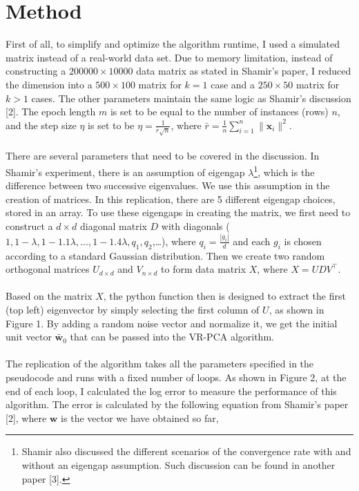 \documentclass{article}
\begin{document}
\section{Method}
First of all, to simplify and optimize the algorithm runtime, I used a simulated matrix instead of a real-world data set. Due to memory limitation, instead of constructing a $200000\times10000$ data matrix as stated in Shamir’s paper, I reduced the dimension into a $500\times100$ matrix for $k=1$ case and a $250\times50$ matrix for $k>1$ cases. The other parameters maintain the same logic as Shamir’s discussion [2]. The epoch length $m$ is set to be equal to the number of instances (rows) $n$, and the step size $\eta$ is set to be $\eta=\frac{1}{\bar{r}\sqrt{n}}$, where $\bar{r}=\frac{1}{n}\sum^n_{i=1}\|\textbf{x}_i\|^2$. \\ \\
There are several parameters that need to be covered in the discussion. In Shamir’s experiment, there is an assumption of eigengap $\lambda$\footnote{Shamir also discussed the different scenarios of the convergence rate with and without an eigengap assumption. Such discussion can be found in another paper [3].}, which is the difference between two successive eigenvalues. We use this assumption in the creation of matrices. In this replication, there are 5 different eigengap choices, stored in an array. To use these eigengaps in creating the matrix, we first need to construct a $d\times d$ diagonal matrix $D$ with diagonals ($1,1-\lambda,1-1.1\lambda,…,1-1.4\lambda,q_1,q_2$,…), where $q_i=\frac{|g_i|}{d}$ and each $g_i$ is chosen according to a standard Gaussian distribution. Then we create two random orthogonal matrices $U_{d\times d}$ and $V_{n\times d}$ to form data matrix $X$, where $X=UDV^\top$.\\ \\ 
Based on the matrix $X$, the python function then is designed to extract the first (top left) eigenvector by simply selecting the first column of $U$, as shown in Figure 1. By adding a random noise vector and normalize it, we get the initial unit vector $\tilde{\textbf{w}_0}$ that can be passed into the VR-PCA algorithm. \\ \\
The replication of the algorithm takes all the parameters specified in the pseudocode and runs with a fixed number of loops. As shown in Figure 2, at the end of each loop, I calculated the log error to measure the performance of this algorithm. The error is calculated by the following equation from Shamir’s paper [2], where $\textbf{w}$ is the vector we have obtained so far,
\end{document}
